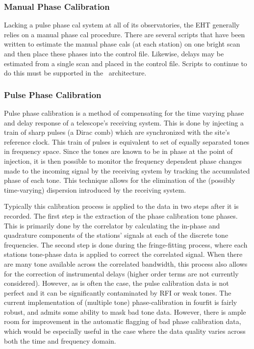 \subsubsection{Manual Phase Calibration}
\label{sec:manphasecal}
Lacking a pulse phase cal system at all of its observatories, the EHT
generally relies on a manual phase cal procedure.  There are several
scripts that have been written to estimate the manual phase cals (at
each station) on one bright scan and then place these phases into the
control file.  Likewise, delays may be estimated from a single scan
and placed in the control file.  Scripts to continue to do this must
be supported in the \nuHOPS~architecture.

\subsubsection{Pulse Phase Calibration}
\label{sec:pulsephasecal}

Pulse phase calibration is a method of compensating for the time varying phase and delay response of a telescope's receiving system. This is done
by injecting a train of sharp pulses (a Dirac comb) which are synchronized with the site's reference clock. This train of pulses is equivalent
to set of equally separated tones in frequency space. Since the tones are known to be in phase at the point of injection, it is then possible to monitor
the frequency dependent phase changes made to the incoming signal by the receiving system by tracking the accumulated phase of each tone.
This technique allows for the elimination of the (possibly time-varying) dispersion introduced by the receiving system.

Typically this calibration process is applied to the data in two steps after it is recorded. The first step is the extraction of the phase calibration tone phases. This is primarily done by
the correlator by calculating the in-phase and quadrature components of the stations' signals at each of the discrete tone frequencies. The second step is done during the fringe-fitting process,
where each stations tone-phase data is applied to correct the correlated signal. When there are many tone available across the correlated bandwidth, this process also allows for the correction of
instrumental delays (higher order terms are not currently considered). However, as is often the case, the pulse calibration data is not perfect and it can be significantly contaminated by RFI or weak tones.
The current implementation of (multiple tone) phase-calibration in fourfit is fairly robust, and admits some ability to mask bad tone data. However, there is ample room for improvement in the automatic
flagging of bad phase calibration data, which would be especially useful in the case where the data quality varies across both the time and frequency domain.


